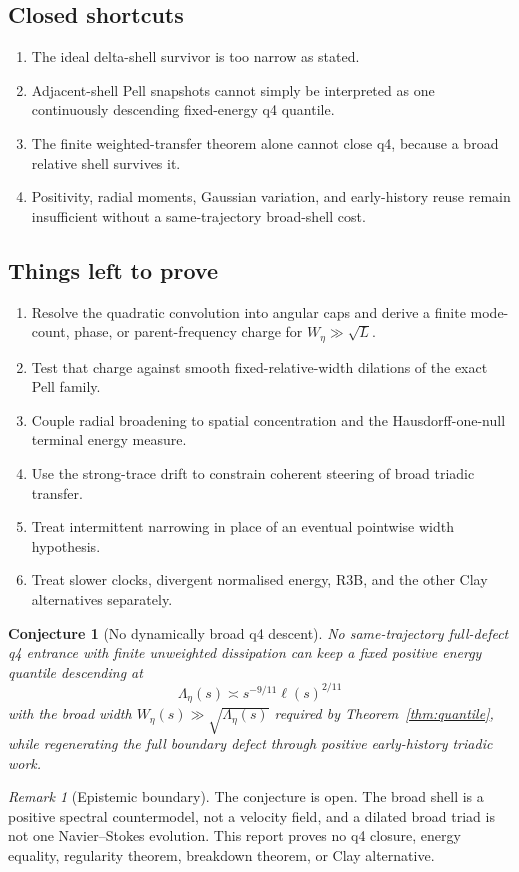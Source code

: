 \documentclass[11pt]{article}
\newtheorem{conjecture}[theorem]{Conjecture}
\theoremstyle{remark}
\newtheorem{remark}[theorem]{Remark}
\begin{document}
\subsection*{Closed shortcuts}

\begin{enumerate}
 \item The ideal delta-shell survivor is too narrow as stated.
 \item Adjacent-shell Pell snapshots cannot simply be interpreted as one
 continuously descending fixed-energy q4 quantile.
 \item The finite weighted-transfer theorem alone cannot close q4,
 because a broad relative shell survives it.
 \item Positivity, radial moments, Gaussian variation, and early-history
 reuse remain insufficient without a same-trajectory broad-shell cost.
\end{enumerate}

\subsection*{Things left to prove}

\begin{enumerate}
 \item Resolve the quadratic convolution into angular caps and derive a
 finite mode-count, phase, or parent-frequency charge for
 \(W_\eta\gg\sqrt L\).
 \item Test that charge against smooth fixed-relative-width dilations of
 the exact Pell family.
 \item Couple radial broadening to spatial concentration and the
 Hausdorff-one-null terminal energy measure.
 \item Use the strong-trace drift to constrain coherent steering of
 broad triadic transfer.
 \item Treat intermittent narrowing in place of an eventual pointwise
 width hypothesis.
 \item Treat slower clocks, divergent normalised energy, R3B, and the
 other Clay alternatives separately.
\end{enumerate}

\begin{conjecture}[No dynamically broad q4 descent]
No same-trajectory full-defect q4 entrance with finite unweighted
dissipation can keep a fixed positive energy quantile descending at
\[
 \Lambda_\eta(s)\asymp
 s^{-9/11}\ell(s)^{2/11}
\]
with the broad width \(W_\eta(s)\gg\sqrt{\Lambda_\eta(s)}\) required by
Theorem~\ref{thm:quantile}, while regenerating the full boundary defect
through positive early-history triadic work.
\end{conjecture}

\begin{remark}[Epistemic boundary]
The conjecture is open.  The broad shell is a positive spectral
countermodel, not a velocity field, and a dilated broad triad is not one
Navier--Stokes evolution.  This report proves no q4 closure, energy
equality, regularity theorem, breakdown theorem, or Clay alternative.
\end{remark}
\end{document}

